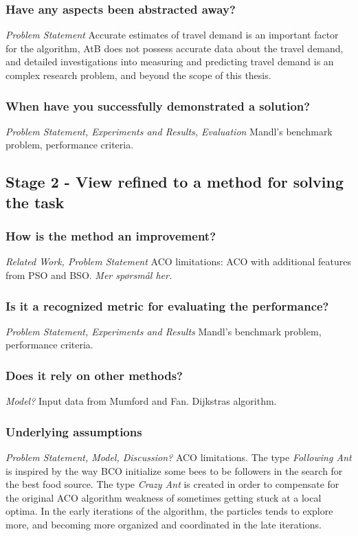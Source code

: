 \subsubsection{Have any aspects been abstracted away?}
\emph{\color{orange} Problem Statement}
Accurate estimates of travel demand is an important factor for the algorithm, AtB does not possess accurate data about the travel demand, and detailed investigations into measuring and predicting travel demand is an complex research problem, and beyond the scope of this thesis. 

\subsubsection{When have you successfully demonstrated a solution?}
\emph{\color{orange} Problem Statement, Experiments and Results, Evaluation}
Mandl's benchmark problem, performance criteria.

\subsection{Stage 2 - View refined to a method for solving the task}

\subsubsection{How is the method an improvement?}
\emph{\color{orange} Related Work, Problem Statement}
ACO limitations: ACO with additional features from PSO and BSO. 
\emph{\color{blue} Mer spørsmål her.}

\subsubsection{Is it a recognized metric for evaluating the performance?}
\emph{\color{orange} Problem Statement, Experiments and Results}
Mandl's benchmark problem, performance criteria.

\subsubsection{Does it rely on other methods?}
\emph{\color{orange} Model?}
Input data from Mumford and Fan. Dijkstras algorithm.

\subsubsection{Underlying assumptions}
\emph{\color{orange} Problem Statement, Model, Discussion?}
ACO limitations. The type \textit{Following Ant} is inspired by the way BCO initialize some bees to be followers in the search for the best food source. The type \textit{Crazy Ant} is created in order to compensate for the original ACO algorithm weakness of sometimes getting stuck at a local optima. In the early iterations of the algorithm, the particles tends to explore more, and becoming more organized and coordinated in the late iterations.

